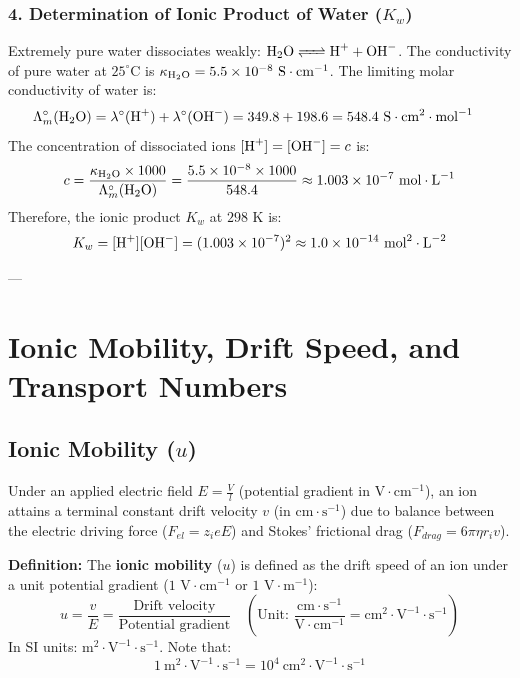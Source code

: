 \subsubsection{4. Determination of Ionic Product of Water ($K_w$)}
Extremely pure water dissociates weakly: $\ce{H2O <=> H+ + OH-}$.
The conductivity of pure water at $25^\circ\text{C}$ is $\kappa_{\ce{H2O}} = 5.5 \times 10^{-8}\ \text{S}\cdot\text{cm}^{-1}$.
The limiting molar conductivity of water is:
\begin{align*}
    \Lambda_m^\circ(\ce{H2O}) &= \lambda^\circ(\ce{H+}) + \lambda^\circ(\ce{OH-}) = 349.8 + 198.6 = 548.4\ \text{S}\cdot\text{cm}^2\cdot\text{mol}^{-1}
\end{align*}
The concentration of dissociated ions $[\ce{H+}] = [\ce{OH-}] = c$ is:
\begin{equation}
    c = \frac{\kappa_{\ce{H2O}} \times 1000}{\Lambda_m^\circ(\ce{H2O})} = \frac{5.5 \times 10^{-8} \times 1000}{548.4} \approx 1.003 \times 10^{-7}\ \text{mol}\cdot\text{L}^{-1}
\end{equation}
Therefore, the ionic product $K_w$ at $298\text{ K}$ is:
\begin{equation}
    K_w = [\ce{H+}][\ce{OH-}] = (1.003 \times 10^{-7})^2 \approx 1.0 \times 10^{-14}\ \text{mol}^2\cdot\text{L}^{-2}
\end{equation}

---

\section{Ionic Mobility, Drift Speed, and Transport Numbers}

\subsection{Ionic Mobility ($u$)}
Under an applied electric field $E = \frac{V}{l}$ (potential gradient in $\text{V}\cdot\text{cm}^{-1}$), an ion attains a terminal constant drift velocity $v$ (in $\text{cm}\cdot\text{s}^{-1}$) due to balance between the electric driving force ($F_{el} = z_i e E$) and Stokes' frictional drag ($F_{drag} = 6\pi \eta r_i v$).

\textbf{Definition:} The \textbf{ionic mobility} ($u$) is defined as the drift speed of an ion under a unit potential gradient ($1\text{ V}\cdot\text{cm}^{-1}$ or $1\text{ V}\cdot\text{m}^{-1}$):
\begin{equation}
    \boxed{u = \frac{v}{E} = \frac{\text{Drift velocity}}{\text{Potential gradient}}} \quad \left(\text{Unit: } \frac{\text{cm}\cdot\text{s}^{-1}}{\text{V}\cdot\text{cm}^{-1}} = \text{cm}^2\cdot\text{V}^{-1}\cdot\text{s}^{-1}\right)
\end{equation}
In SI units: $\text{m}^2\cdot\text{V}^{-1}\cdot\text{s}^{-1}$. Note that:
\begin{equation}
    1\ \text{m}^2\cdot\text{V}^{-1}\cdot\text{s}^{-1} = 10^4\ \text{cm}^2\cdot\text{V}^{-1}\cdot\text{s}^{-1}
\end{equation}

